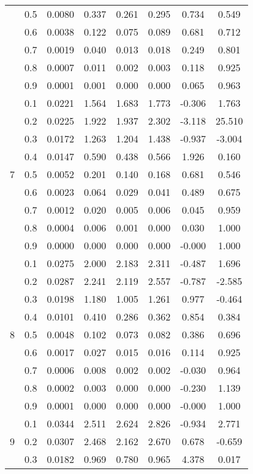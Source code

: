 \documentclass[11pt,a4paper]{report}
\begin{document}
\begin{longtable}{ | c | c || c | c | c | c | c | c | }
 & 0.5 & 0.0080 & 0.337 & 0.261 & 0.295 & 0.734 & 0.549 \\
 & 0.6 & 0.0038 & 0.122 & 0.075 & 0.089 & 0.681 & 0.712 \\
 & 0.7 & 0.0019 & 0.040 & 0.013 & 0.018 & 0.249 & 0.801 \\
 & 0.8 & 0.0007 & 0.011 & 0.002 & 0.003 & 0.118 & 0.925 \\
 & 0.9 & 0.0001 & 0.001 & 0.000 & 0.000 & 0.065 & 0.963 \\
 \hline
\multirow{9}{*}{7} & 0.1 & 0.0221 & 1.564 & 1.683 & 1.773 & -0.306 & 1.763 \\
 & 0.2 & 0.0225 & 1.922 & 1.937 & 2.302 & -3.118 & 25.510 \\
 & 0.3 & 0.0172 & 1.263 & 1.204 & 1.438 & -0.937 & -3.004 \\
 & 0.4 & 0.0147 & 0.590 & 0.438 & 0.566 & 1.926 & 0.160 \\
 & 0.5 & 0.0052 & 0.201 & 0.140 & 0.168 & 0.681 & 0.546 \\
 & 0.6 & 0.0023 & 0.064 & 0.029 & 0.041 & 0.489 & 0.675 \\
 & 0.7 & 0.0012 & 0.020 & 0.005 & 0.006 & 0.045 & 0.959 \\
 & 0.8 & 0.0004 & 0.006 & 0.001 & 0.000 & 0.030 & 1.000 \\
 & 0.9 & 0.0000 & 0.000 & 0.000 & 0.000 & -0.000 & 1.000 \\
 \hline
\multirow{9}{*}{8} & 0.1 & 0.0275 & 2.000 & 2.183 & 2.311 & -0.487 & 1.696 \\
 & 0.2 & 0.0287 & 2.241 & 2.119 & 2.557 & -0.787 & -2.585 \\
 & 0.3 & 0.0198 & 1.180 & 1.005 & 1.261 & 0.977 & -0.464 \\
 & 0.4 & 0.0101 & 0.410 & 0.286 & 0.362 & 0.854 & 0.384 \\
 & 0.5 & 0.0048 & 0.102 & 0.073 & 0.082 & 0.386 & 0.696 \\
 & 0.6 & 0.0017 & 0.027 & 0.015 & 0.016 & 0.114 & 0.925 \\
 & 0.7 & 0.0006 & 0.008 & 0.002 & 0.002 & -0.030 & 0.964 \\
 & 0.8 & 0.0002 & 0.003 & 0.000 & 0.000 & -0.230 & 1.139 \\
 & 0.9 & 0.0001 & 0.000 & 0.000 & 0.000 & -0.000 & 1.000 \\
 \hline
\multirow{9}{*}{9} & 0.1 & 0.0344 & 2.511 & 2.624 & 2.826 & -0.934 & 2.771 \\
 & 0.2 & 0.0307 & 2.468 & 2.162 & 2.670 & 0.678 & -0.659 \\
 & 0.3 & 0.0182 & 0.969 & 0.780 & 0.965 & 4.378 & 0.017 \\

\end{longtable}
\end{document}

